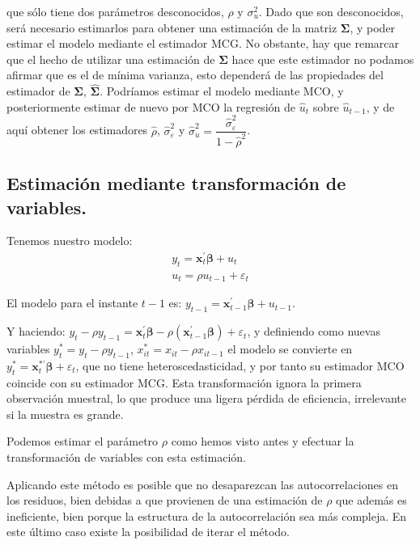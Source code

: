  que s\'olo tiene dos par\'ametros desconocidos, $\rho$ y $\sigma_{u}^{2}$.
Dado que son desconocidos, ser\'a necesario estimarlos para obtener
una estimaci\'on de la matriz $\boldsymbol{\Sigma}$, y poder estimar
el modelo mediante el estimador MCG. No obstante, hay que remarcar
que el hecho de utilizar una estimaci\'on de $\boldsymbol{\Sigma}$
hace que este estimador no podamos afirmar que es el de m\'inima varianza,
esto depender\'a de las propiedades del estimador de $\boldsymbol{\Sigma}$,
$\hat{\boldsymbol{\Sigma}}$. Podr\'iamos estimar el modelo mediante
MCO, y posteriormente estimar de nuevo por MCO la regresi\'on de $\hat{u}_{t}$
sobre $\hat{u}_{t-1}$, y de aqu\'i obtener los estimadores $\hat{\rho}$,
$\hat{\sigma}_{\varepsilon}^{2}$ y $\hat{\sigma}_{u}^{2}=\dfrac{\hat{\sigma}_{\varepsilon}^{2}}{1-\hat{\rho}^{2}}$.


\subsection{Estimaci\'on mediante transformaci\'on de variables.}

Tenemos nuestro modelo: 
\[
\begin{array}{c}
y_{t}=\boldsymbol{x}_{t}^{\prime}\boldsymbol{\beta}+u_{t}\\
u_{t}=\rho u_{t-1}+\varepsilon_{t}
\end{array}
\]


El modelo para el instante $t-1$ es: $y_{t-1}=\boldsymbol{x}_{t-1}^{\prime}\boldsymbol{\beta}+u_{t-1}$.

Y haciendo: $y_{t}-\rho y_{t-1}=\boldsymbol{x}_{t}^{\prime}\boldsymbol{\beta}-\rho\left(\boldsymbol{x}_{t-1}^{\prime}\boldsymbol{\beta}\right)+\varepsilon_{t}$,
y definiendo como nuevas variables $y_{t}^{*}=y_{t}-\rho y_{t-1}$,
$x_{it}^{*}=x_{it}-\rho x_{it-1}$ el modelo se convierte en $y_{t}^{*}=\boldsymbol{x}_{t}^{*\prime}\boldsymbol{\beta}+\varepsilon_{t}$,
que no tiene heteroscedasticidad, y por tanto su estimador MCO coincide
con su estimador MCG. Esta transformaci\'on ignora la primera observaci\'on
muestral, lo que produce una ligera p\'erdida de eficiencia, irrelevante
si la muestra es grande.

Podemos estimar el par\'ametro $\rho$ como hemos visto antes y efectuar
la transformaci\'on de variables con esta estimaci\'on.

Aplicando este m\'etodo es posible que no desaparezcan las autocorrelaciones
en los residuos, bien debidas a que provienen de una estimaci\'on de
$\rho$ que adem\'as es ineficiente, bien porque la estructura de la
autocorrelaci\'on sea m\'as compleja. En este \'ultimo caso existe la posibilidad
de iterar el m\'etodo.

